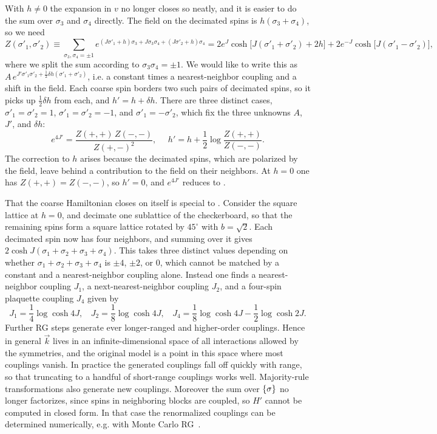 With $h\neq0$ the expansion in $v$ no longer closes so neatly, and it is easier
to do the sum over $\sigma_3$ and $\sigma_4$ directly. The field on the decimated spins
is $h(\sigma_3+\sigma_4)$, so we need
\begin{equation}
  Z(\sigma'_1,\sigma'_2)\equiv\sum_{\sigma_3,\sigma_4=\pm1}
  e^{(J\sigma'_1+h)\sigma_3+J\sigma_3\sigma_4+(J\sigma'_2+h)\sigma_4}
  =2e^{J}\cosh\big[J(\sigma'_1+\sigma'_2)+2h\big]
   +2e^{-J}\cosh\big[J(\sigma'_1-\sigma'_2)\big],
\end{equation}
where we split the sum according to $\sigma_3\sigma_4=\pm1$. We would like to write
this as $A\,e^{J'\sigma'_1\sigma'_2+\frac{1}{2}\delta h(\sigma'_1+\sigma'_2)}$, i.e. a constant
times a nearest-neighbor coupling and a shift in the field. Each coarse spin borders
two such pairs of decimated spins, so it picks up $\frac{1}{2}\delta h$ from each,
and $h'=h+\delta h$. There are three distinct cases,
$\sigma'_1=\sigma'_2=1$, $\sigma'_1=\sigma'_2=-1$, and $\sigma'_1=-\sigma'_2$, which fix the three
unknowns $A$, $J'$, and $\delta h$:
\begin{equation}\label{eq:1dIsingRGh}
  e^{4J'}=\frac{Z(+,+)\,Z(-,-)}{Z(+,-)^2},~~~~~~
  h'=h+\frac{1}{2}\log\frac{Z(+,+)}{Z(-,-)}.
\end{equation}
The correction to $h$ arises because the decimated spins, which are polarized by
the field, leave behind a contribution to the field on their neighbors. At $h=0$
one has $Z(+,+)=Z(-,-)$, so $h'=0$, and $e^{4J'}$ reduces to
.

That the coarse Hamiltonian closes on itself is special to . Consider
the square lattice at $h=0$, and decimate one sublattice of the checkerboard,
so that the remaining spins form a square lattice rotated by $45^\circ$
with $b=\sqrt{2}$. Each decimated spin now has four neighbors, and summing
over it gives $2\cosh J(\sigma_1+\sigma_2+\sigma_3+\sigma_4)$. This takes three distinct values
depending on whether $\sigma_1+\sigma_2+\sigma_3+\sigma_4$ is $\pm4$, $\pm2$, or 0, which cannot be
matched by a constant and a nearest-neighbor coupling alone. Instead one finds
a nearest-neighbor coupling $J_1$, a next-nearest-neighbor coupling $J_2$, and a
four-spin plaquette coupling $J_4$ given by
\begin{equation}
  J_1=\frac{1}{4}\log\cosh4J,~~~~J_2=\frac{1}{8}\log\cosh4J,~~~~
  J_4=\frac{1}{8}\log\cosh4J-\frac{1}{2}\log\cosh2J.
\end{equation}
Further RG steps generate ever longer-ranged and higher-order couplings. Hence
in general $\vec{k}$ lives in an infinite-dimensional space of all interactions
allowed by the symmetries, and the original model is a point in this space where
most couplings vanish. In practice the generated couplings fall off quickly with
range, so that truncating to a handful of short-range couplings works well.
Majority-rule transformations also generate new couplings. Moreover the sum over
$\left\{\sigma\right\}$ no longer factorizes, since spins in neighboring blocks are coupled,
so $H'$ cannot be computed in closed form. In that case the renormalized couplings
can be determined numerically, e.g. with 
Monte Carlo RG~\cite{ma_renormalization_1976,swendsen_monte_1979}.

